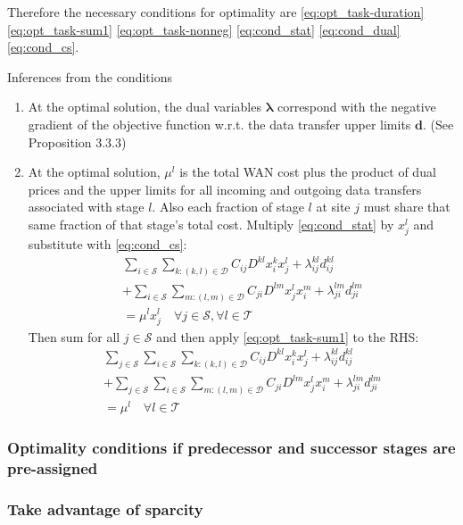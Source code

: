 Therefore the necessary conditions for optimality are \eqref{eq:opt_task-duration} \eqref{eq:opt_task-sum1} \eqref{eq:opt_task-nonneg} \eqref{eq:cond_stat} \eqref{eq:cond_dual} \eqref{eq:cond_cs}.

Inferences from the conditions
\begin{enumerate}
	\item At the optimal solution, the dual variables $\boldsymbol{\lambda}$ correspond with the negative gradient of the objective function w.r.t. the data transfer upper limits $\mathbf{d}$. (See \cite{bertsekas1999nonlinear} Proposition 3.3.3)
	\item At the optimal solution, $\mu^l$ is the total WAN cost plus the product of dual prices and the upper limits for all incoming and outgoing data transfers associated with stage $l$.
	Also each fraction of stage $l$ at site $j$ must share that same fraction of that stage's total cost. 
	Multiply \eqref{eq:cond_stat} by $x_j^l$ and substitute with \eqref{eq:cond_cs}:
	\begin{align}
		\sum_{i\in\mathcal{S}}\sum_{k:(k,l)\in\mathcal{D}} C_{ij}D^{kl}x_i^kx_j^l + \lambda_{ij}^{kl}d_{ij}^{kl} \nonumber \\
		+ \sum_{i\in\mathcal{S}}\sum_{m:(l,m)\in\mathcal{D}} C_{ji}D^{lm}x_j^lx_i^m+ \lambda_{ji}^{lm}d_{ji}^{lm} \nonumber \\
		= \mu^lx_j^l
		\quad \forall j\in\mathcal{S},\forall l\in\mathcal{T}
	\end{align}
	Then sum for all $j\in\mathcal{S}$ and then apply \eqref{eq:opt_task-sum1} to the RHS:
	\begin{align}
		\sum_{j\in\mathcal{S}}\sum_{i\in\mathcal{S}}\sum_{k:(k,l)\in\mathcal{D}} C_{ij}D^{kl}x_i^kx_j^l + \lambda_{ij}^{kl}d_{ij}^{kl} \nonumber \\
		+ \sum_{j\in\mathcal{S}}\sum_{i\in\mathcal{S}}\sum_{m:(l,m)\in\mathcal{D}} C_{ji}D^{lm}x_j^lx_i^m+ \lambda_{ji}^{lm}d_{ji}^{lm} \nonumber \\
		= \mu^l
		\quad \forall l\in\mathcal{T}
	\end{align}
\end{enumerate}

\subsubsection{Optimality conditions if predecessor and successor stages are pre-assigned} \todo{}

\subsubsection{Take advantage of sparcity} \todo{}